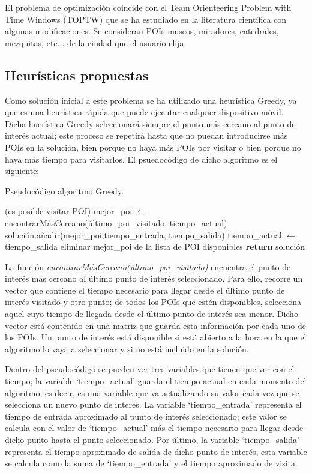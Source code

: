 El problema de optimización coincide con el Team Orienteering Problem with Time Windows (TOPTW) que se ha estudiado en la literatura científica con algunas modificaciones. Se consideran POIs museos, miradores, catedrales, mezquitas, etc... de la ciudad que el usuario elija.
\subsection[Heurísticas propuestas]{Heurísticas propuestas}
Como solución inicial a este problema se ha utilizado una heurística Greedy, ya que es una heurística rápida que puede ejecutar cualquier dispositivo móvil. Dicha huerística Greedy seleccionará siempre el punto más cercano al punto de interés actual; este proceso se repetirá hasta que no puedan introducirse más POIs en la solución, bien porque no haya más POIs por visitar o bien porque no haya más tiempo para visitarlos. El psuedocódigo de dicho algoritmo es el siguiente:\newline
\begin{algorithm}[H]
	\caption{Pseudocódigo algoritmo Greedy.}
	\label{alg:greedy_alg}
	\begin{algorithmic}
		\While(es posible visitar POI)
		\State mejor\_poi $\gets$ encontrarMásCercano(último\_poi\_visitado, tiempo\_actual) 
		\State solución.añadir(mejor\_poi,tiempo\_entrada, tiempo\_salida)
		\State tiempo\_actual $\gets$ tiempo\_salida
		\State eliminar mejor\_poi de la lista de POI disponibles
		\EndWhile
		\State \textbf{return} solución
		\EndFunction
	\end{algorithmic}
\end{algorithm}
\vspace{0.06in}
La función \textit{encontrarMásCercano(último\_poi\_visitado)} encuentra el punto de interés más cercano al último punto de interés seleccionado. Para ello, recorre un vector que contiene el tiempo necesario para llegar desde el último punto de interés visitado y otro punto; de todos los POIs que estén disponibles, selecciona aquel cuyo tiempo de llegada desde el último punto de interés sea menor. Dicho vector está contenido en una matriz que guarda esta información por cada uno de los POIs. Un punto de interés está disponible si está abierto a la hora en la que el algoritmo lo vaya a seleccionar y si no está incluido en la solución.\newline

Dentro del pseudocódigo se pueden ver tres variables que tienen que ver con el tiempo; la variable \enquote*{tiempo\_actual} guarda el tiempo actual en cada momento del algoritmo, es decir, es una variable que va actualizando su valor cada vez que se selecciona un nuevo punto de interés. La variable \enquote*{tiempo\_entrada} representa el tiempo de entrada aproximado al punto de interés seleccionado; este valor se calcula con el valor de \enquote*{tiempo\_actual} más el tiempo necesario para llegar desde dicho punto hasta el punto seleccionado. Por último, la variable \enquote*{tiempo\_salida} representa el tiempo aproximado de salida de dicho punto de interés, esta variable se calcula como la suma de \enquote*{tiempo\_entrada} y el tiempo aproximado de visita.\newline

